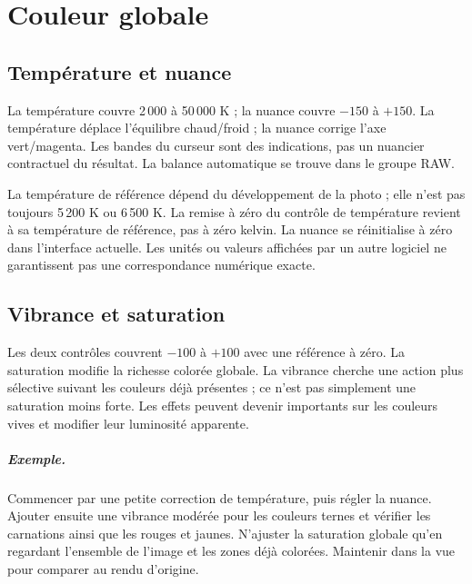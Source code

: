 \chapter{Couleur globale}
\section{Température et nuance}
La température couvre 2\,000 à 50\,000 K ; la nuance couvre $-150$ à $+150$.
La température déplace l’équilibre chaud/froid ; la nuance corrige l’axe
vert/magenta. Les bandes du curseur sont des indications, pas un nuancier
contractuel du résultat. La balance automatique se trouve dans le groupe RAW.

La température de référence dépend du développement de la photo ; elle n’est
pas toujours 5\,200 K ou 6\,500 K. La remise à zéro du contrôle de température
revient à sa température de référence, pas à zéro kelvin. La nuance se
réinitialise à zéro dans l’interface actuelle. Les unités ou valeurs affichées
par un autre logiciel ne garantissent pas une correspondance numérique exacte.

\section{Vibrance et saturation}
Les deux contrôles couvrent $-100$ à $+100$ avec une référence à zéro.
La saturation modifie la richesse colorée globale. La vibrance cherche une
action plus sélective suivant les couleurs déjà présentes ; ce n’est pas
simplement une saturation moins forte. Les effets peuvent devenir importants
sur les couleurs vives et modifier leur luminosité apparente.

\paragraph{Exemple.}
Commencer par une petite correction de température, puis régler la nuance.
Ajouter ensuite une vibrance modérée pour les couleurs ternes et vérifier
les carnations ainsi que les rouges et jaunes. N’ajuster la saturation
globale qu’en regardant l’ensemble de l’image et les zones déjà colorées.
Maintenir  dans la vue pour comparer au rendu d’origine.

\gestesreglages
